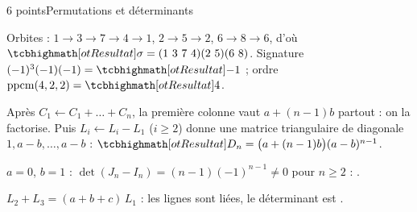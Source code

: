 

\begin{corrigeEval}{6 points}{Permutations et déterminants}
\begin{questions}
  \item Orbites : $1\to3\to7\to4\to1$, $2\to5\to2$, $6\to8\to6$, d'où
    $\res{\sigma=(1\ 3\ 7\ 4)(2\ 5)(6\ 8)}$. Signature
    $(-1)^{3}(-1)(-1)=\res{-1}$ ; ordre $\operatorname{ppcm}(4,2,2)=\res{4}$.
  \item Après $C_1\leftarrow C_1+\dots+C_n$, la première colonne vaut
    $a+(n-1)b$ partout : on la factorise. Puis $L_i\leftarrow L_i-L_1$
    ($i\geqslant2$) donne une matrice triangulaire de diagonale
    $1,a-b,\dots,a-b$ : $\res{D_n=\bigl(a+(n-1)b\bigr)(a-b)^{n-1}}$.
  \item $a=0$, $b=1$ : $\det(J_n-I_n)=(n-1)(-1)^{n-1}\neq0$ pour
    $n\geqslant2$ : . \pts{1 pt}
  \item $L_2+L_3=(a+b+c)\,L_1$ : les lignes sont liées, le déterminant est
    . \pts{1 pt}
\end{questions}
\end{corrigeEval}

